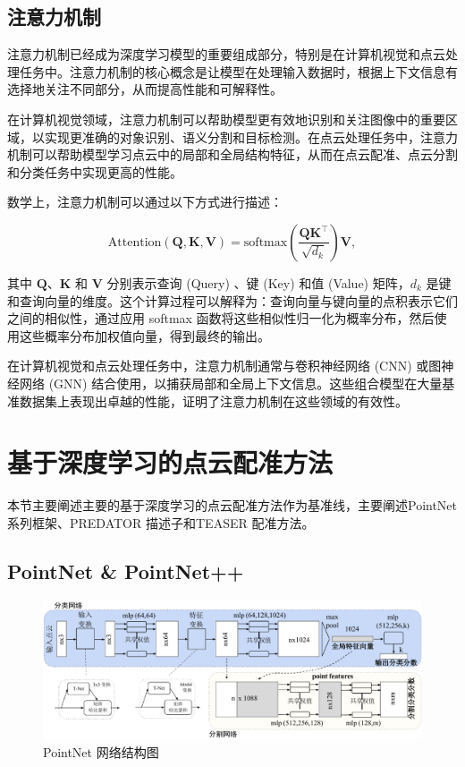 \subsection{注意力机制}
注意力机制已经成为深度学习模型的重要组成部分，特别是在计算机视觉和点云处理任务中。注意力机制的核心概念是让模型在处理输入数据时，根据上下文信息有选择地关注不同部分，从而提高性能和可解释性。

在计算机视觉领域，注意力机制可以帮助模型更有效地识别和关注图像中的重要区域，以实现更准确的对象识别、语义分割和目标检测。在点云处理任务中，注意力机制可以帮助模型学习点云中的局部和全局结构特征，从而在点云配准、点云分割和分类任务中实现更高的性能。

数学上，注意力机制可以通过以下方式进行描述：

\begin{equation}
\text{Attention}(\boldsymbol{Q}, \boldsymbol{K}, \boldsymbol{V}) = \text{softmax}(\frac{\boldsymbol{Q}\boldsymbol{K}^\top}{\sqrt{d_k}})\boldsymbol{V},
\end{equation}

其中 $\boldsymbol{Q}$、$\boldsymbol{K}$ 和 $\boldsymbol{V}$ 分别表示查询 (Query) 、键 (Key) 和值 (Value) 矩阵，$d_k$ 是键和查询向量的维度。这个计算过程可以解释为：查询向量与键向量的点积表示它们之间的相似性，通过应用 softmax 函数将这些相似性归一化为概率分布，然后使用这些概率分布加权值向量，得到最终的输出。

在计算机视觉和点云处理任务中，注意力机制通常与卷积神经网络 (CNN) 或图神经网络 (GNN) 结合使用，以捕获局部和全局上下文信息。这些组合模型在大量基准数据集上表现出卓越的性能，证明了注意力机制在这些领域的有效性。


\section{基于深度学习的点云配准方法}
本节主要阐述主要的基于深度学习的点云配准方法作为基准线，主要阐述PointNet\cite{qi2017pointnet, qi2017pointnet++} 系列框架、PREDATOR\cite{huang2021predator} 描述子和TEASER\cite{yang2020teaser} 配准方法。

\subsection{PointNet \& PointNet++}
\begin{figure}
    \centering
    \includegraphics[width=\linewidth]{images/pointnet.pdf}
    \caption{PointNet\cite{qi2017pointnet} 网络结构图}
    \label{fig:pointnet}
    \vspace{-5mm}
\end{figure}

